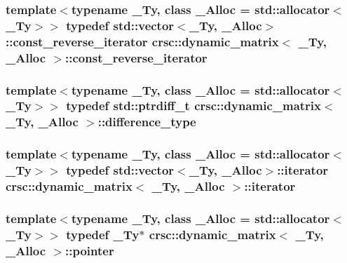 \subsubsection[{\texorpdfstring{const\+\_\+reverse\+\_\+iterator}{const_reverse_iterator}}]{\setlength{\rightskip}{0pt plus 5cm}template$<$typename \+\_\+\+Ty, class \+\_\+\+Alloc = std\+::allocator$<$\+\_\+\+Ty$>$$>$ typedef std\+::vector$<$\+\_\+\+Ty, \+\_\+\+Alloc$>$\+::{\bf const\+\_\+reverse\+\_\+iterator} {\bf crsc\+::dynamic\+\_\+matrix}$<$ \+\_\+\+Ty, \+\_\+\+Alloc $>$\+::{\bf const\+\_\+reverse\+\_\+iterator}}\hypertarget{classcrsc_1_1dynamic__matrix_abb589a5b7c7d7869e00f82ac7370cf93}{}\label{classcrsc_1_1dynamic__matrix_abb589a5b7c7d7869e00f82ac7370cf93}
\subsubsection[{\texorpdfstring{difference\+\_\+type}{difference_type}}]{\setlength{\rightskip}{0pt plus 5cm}template$<$typename \+\_\+\+Ty, class \+\_\+\+Alloc = std\+::allocator$<$\+\_\+\+Ty$>$$>$ typedef std\+::ptrdiff\+\_\+t {\bf crsc\+::dynamic\+\_\+matrix}$<$ \+\_\+\+Ty, \+\_\+\+Alloc $>$\+::{\bf difference\+\_\+type}}\hypertarget{classcrsc_1_1dynamic__matrix_a46c3124226d9b209aae58572e4462707}{}\label{classcrsc_1_1dynamic__matrix_a46c3124226d9b209aae58572e4462707}
\subsubsection[{\texorpdfstring{iterator}{iterator}}]{\setlength{\rightskip}{0pt plus 5cm}template$<$typename \+\_\+\+Ty, class \+\_\+\+Alloc = std\+::allocator$<$\+\_\+\+Ty$>$$>$ typedef std\+::vector$<$\+\_\+\+Ty, \+\_\+\+Alloc$>$\+::{\bf iterator} {\bf crsc\+::dynamic\+\_\+matrix}$<$ \+\_\+\+Ty, \+\_\+\+Alloc $>$\+::{\bf iterator}}\hypertarget{classcrsc_1_1dynamic__matrix_a2fe15f8dee8317af955c053888308927}{}\label{classcrsc_1_1dynamic__matrix_a2fe15f8dee8317af955c053888308927}
\subsubsection[{\texorpdfstring{pointer}{pointer}}]{\setlength{\rightskip}{0pt plus 5cm}template$<$typename \+\_\+\+Ty, class \+\_\+\+Alloc = std\+::allocator$<$\+\_\+\+Ty$>$$>$ typedef \+\_\+\+Ty$\ast$ {\bf crsc\+::dynamic\+\_\+matrix}$<$ \+\_\+\+Ty, \+\_\+\+Alloc $>$\+::{\bf pointer}}\hypertarget{classcrsc_1_1dynamic__matrix_a9ed63c32093334327c1f7a4822d6feb6}{}\label{classcrsc_1_1dynamic__matrix_a9ed63c32093334327c1f7a4822d6feb6}
